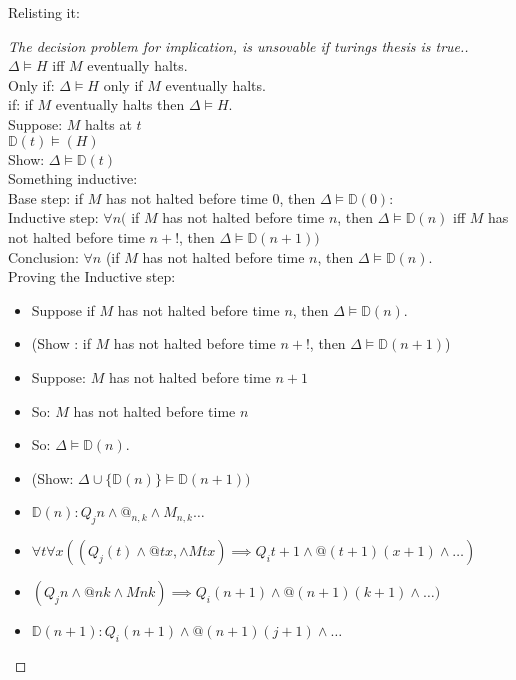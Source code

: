 Relisting it: 
\begin{proof}[The decision problem for implication, is unsovable if turings thesis is true.]
$\Delta \vDash H$ iff $M$ eventually halts. \\
Only if: $\Delta \vDash H$ only if $M$ eventually halts. \\
if: if $M$ eventually halts then $\Delta \vDash H$. \\
Suppose: $M$ halts at $t$\\
$\mathbb{D}(t) \vDash(H)$ \\ %
Show: $\Delta \vDash \mathbb{D}(t)$ \\

Something inductive: \\
Base step: if $M$ has not halted before time 0, then $\Delta \vDash \mathbb{D}(0)$: \\
Inductive step: $\forall n ($ if $M$ has not halted before time $n$, then $\Delta \vDash \mathbb{D}(n)$ iff $M$ has not halted before time $n+!$, then $\Delta \vDash \mathbb{D}(n+1))$ \\
Conclusion: $\forall n$ (if $M$  has not halted before time $n$, then $\Delta \vDash \mathbb{D}(n)$. \\

Proving the Inductive step: \\
\begin{itemize}
\item Suppose if $M$ has not halted before time $n$, then $\Delta \vDash \mathbb{D}(n)$.
\item (Show : if $M$ has not halted before time $n+!$, then $\Delta \vDash \mathbb{D}(n+1)$)
\item Suppose: $M$ has not halted before time $n+1$
\item So: $M$ has not halted before time $n$
\item So: $\Delta \vDash \mathbb{D}(n)$.
\item (Show: $\Delta \cup \{\mathbb{D}(n)\} \vDash \mathbb{D}(n+1))$
\item $\mathbb{D}(n): Q_jn \wedge @_{n,k} \wedge M_{n,k} \dots$
\item $\forall t \forall x ((Q_j(t) \wedge @tx, \wedge Mtx) \implies Q_it+1 \wedge @(t+1)(x+1) \wedge \dots)$
\item $(Q_jn \wedge @nk \wedge Mnk) \implies Q_i(n+1) \wedge @(n+1)(k+1) \wedge \dots)$
\item $\mathbb{D}(n+1): Q_i(n+1) \wedge @(n+1)(j+1)\wedge \dots$
\end{itemize}

\end{proof}

